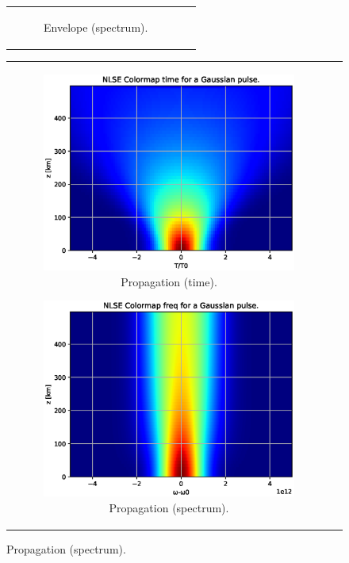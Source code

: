 \begin{figure}[label={fig:n1pb}, caption={Solution of the NLSE using SSFM for N=1 and $\beta_2 > 0$.}]
\begin{tabular}[c]{cc}
\begin{subfigure}[b]{.53\textwidth}
            \caption{Envelope (spectrum).}
            \label{fig:eN1bs}
        \end{subfigure}
        \end{tabular}
        \begin{tabular}[c]{cc}
        \centering	
        \begin{subfigure}[b]{.53\textwidth}
		    \centering	
            \includegraphics[width=1\textwidth]{figures/chap3/SSFM/N1bt.eps}
            \caption{Propagation (time).}
            \label{fig:N1bt}
        \end{subfigure}
        \hfill
        \begin{subfigure}[b]{.53\textwidth}
		    \centering	
            \includegraphics[width=1\textwidth]{figures/chap3/SSFM/N1bs.eps}
            \caption{Propagation (spectrum).}
            \label{fig:N1bs}
        \end{subfigure}
        \end{tabular}
        \end{figure}
        
